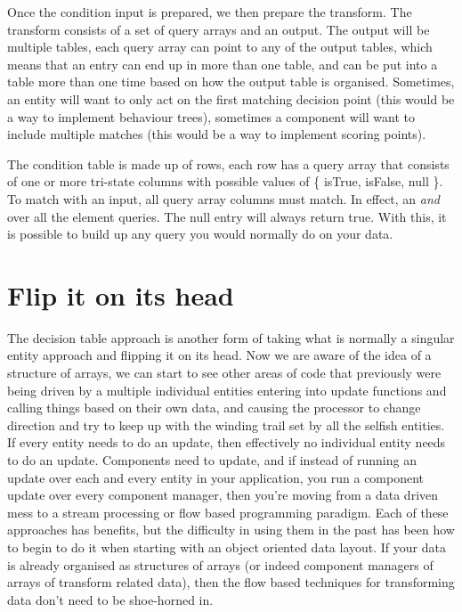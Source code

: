 Once the condition input is prepared, we then prepare the transform. The
transform consists of a set of query arrays and an output. The output will be
multiple tables, each query array can point to any of the output tables, which
means that an entry can end up in more than one table, and can be put into a
table more than one time based on how the output table is organised. Sometimes,
an entity will want to only act on the first matching decision point (this
would be a way to implement behaviour trees), sometimes a component will want
to include multiple matches (this would be a way to implement scoring points).

The condition table is made up of rows, each row has a query array that
consists of one or more tri-state columns with possible values of \{ isTrue,
isFalse, null \}. To match with an input, all query array columns must match.
In effect, an {\em and} over all the element queries. The null entry will
always return true. With this, it is possible to build up any query you would
normally do on your data.

\section{Flip it on its head}

The decision table approach is another form of taking what is normally a
singular entity approach and flipping it on its head. Now we are aware of the
idea of a structure of arrays, we can start to see other areas of code that
previously were being driven by a multiple individual entities entering into
update functions and calling things based on their own data, and causing the
processor to change direction and try to keep up with the winding trail set by
all the selfish entities. If every entity needs to do an update, then
effectively no individual entity needs to do an update. Components need to
update, and if instead of running an update over each and every entity in your
application, you run a component update over every component manager, then
you're moving from a data driven mess to a stream processing or flow based
programming paradigm. Each of these approaches has benefits, but the difficulty
in using them in the past has been how to begin to do it when starting with an
object oriented data layout. If your data is already organised as structures of
arrays (or indeed component managers of arrays of transform related data), then
the flow based techniques for transforming data don't need to be shoe-horned
in.

